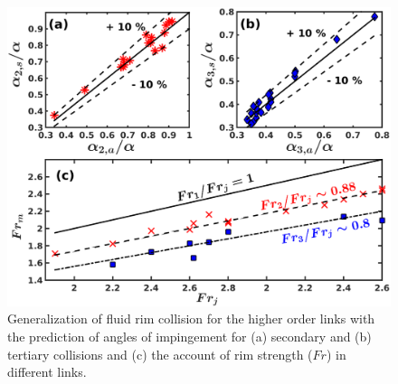 \begin{figure}
	\centering
	\includegraphics[width=\linewidth]{chapters/jetJet/Figure12}
	\caption{Generalization of fluid rim collision for the higher order links with the prediction of angles of impingement for (a) secondary and (b) tertiary collisions and (c) the account of rim strength ($Fr$) in different links.}
	\label{Figure::secondGraph}
\end{figure}
